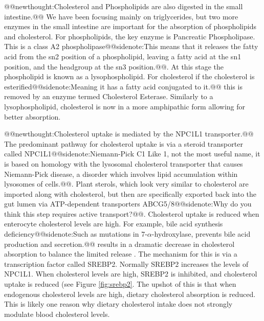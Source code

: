 \documentclass{tufte-handout}
\makeatletter
\def\newthought#1{@@newthought:#1@@}
\def\sidenote#1{@@sidenote:#1@@}
\makeatother
\begin{document}
\newthought{Cholesterol and Phospholipids are also digested in the small intestine.}  We have been focusing mainly on triglycerides, but two more enzymes in the small intestine are important for the absorption of phospholipids and cholesterol.  For phospholipids, the key enzyme is Pancreatic Phospholipase.  This is a class A2 phospholipase\sidenote{This means that it releases the fatty acid from the sn2 position of a phospholipid, leaving a fatty acid at the sn1 position, and the headgroup at the sn3 position.}.  At this stage the phospholipid is known as a lysophospholipid.  For cholesterol if the cholesterol is esterified\sidenote{Meaning it has a fatty acid conjugated to it.} this is removed by an enzyme termed Cholesterol Esterase.  Similarly to a lysophospholipid, cholesterol is now in a more amphipathic form allowing for better absorption.


\newthought{Cholesterol uptake is mediated by the NPC1L1 transporter.}  The predominant pathway for cholesterol uptake is via a steroid transporter called NPC1L1\sidenote{Niemann-Pick C1 Like 1, not the most useful name, it is based on homology with the lysosomal cholesterol transporter that causes Niemann-Pick disease, a disorder which involves lipid accumulation within lysosomes of cells.}\citep{Altmann2004,Iqbal2005}.  Plant sterols, which look very similar to cholesterol are imported along with cholesterol, but then are specifically exported back into the gut lumen via ATP-dependent transporters ABCG5/8\sidenote{Why do you think this step requires active transport?}.  Cholesterol uptake is reduced when enterocyte cholesterol levels are high. For example, bile acid synthesis deficiency\sidenote{Such as mutations in 7-$\alpha$-hydroxylase,  prevents bile acid production and secretion.} results in a dramatic decrease in cholesterol absorption to balance the limited release \citep{Repa2000,Wang2007d}.  The mechanism for this is via a transcription factor called SREBP2.  Normally SREBP2 increases the levels of NPC1L1.  When cholesterol levels are high, SREBP2 is inhibited, and cholesterol uptake is reduced (see Figure \ref{fig:srebp2}.  The upshot of this is that when endogenous cholesterol levels are high, dietary cholesterol absorption is reduced.  This is likely one reason why dietary cholesterol intake does not strongly modulate blood cholesterol levels.
\end{document}
